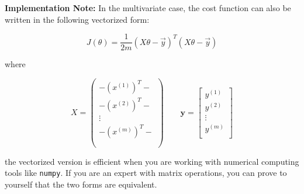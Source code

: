 \documentclass[11pt]{article}
\begin{document}
\textbf{Implementation Note:} In the multivariate case, the cost
function can also be written in the following vectorized form:

\[ J(\theta) = \frac{1}{2m}(X\theta - \vec{y})^T(X\theta - \vec{y}) \]

where

\[ X = \begin{pmatrix}
          - (x^{(1)})^T - \\
          - (x^{(2)})^T - \\
          \vdots \\
          - (x^{(m)})^T - \\ \\
        \end{pmatrix} \qquad \mathbf{y} = \begin{bmatrix} y^{(1)} \\ y^{(2)} \\ \vdots \\ y^{(m)} \\\end{bmatrix}\]

the vectorized version is efficient when you are working with numerical
computing tools like \texttt{numpy}. If you are an expert with matrix
operations, you can prove to yourself that the two forms are equivalent.
\end{document}
